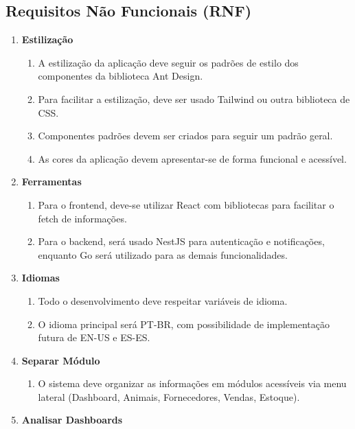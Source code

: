 \documentclass[12pt, a4paper]{article}
\begin{document}
\begin{spacing}{1.5}
\subsection{Requisitos Não Funcionais (RNF)}
\begin{spacing}{1.5}
\begin{enumerate}[label=RNF0\arabic{*}.]
    \item \textbf{Estilização}
    \begin{enumerate}[label=RNF01.0\arabic{*}]
        \item A estilização da aplicação deve seguir os padrões de estilo dos componentes da biblioteca Ant Design.
        \item Para facilitar a estilização, deve ser usado Tailwind ou outra biblioteca de CSS.
        \item Componentes padrões devem ser criados para seguir um padrão geral.
        \item As cores da aplicação devem apresentar-se de forma funcional e acessível.
    \end{enumerate}
    \item \textbf{Ferramentas}
    \begin{enumerate}[label=RNF02.0\arabic{*}]
        \item Para o frontend, deve-se utilizar React com bibliotecas para facilitar o fetch de informações.
        \item Para o backend, será usado NestJS para autenticação e notificações, enquanto Go será utilizado para as demais funcionalidades.
    \end{enumerate}
    \item \textbf{Idiomas}
    \begin{enumerate}[label=RNF03.0\arabic{*}]
        \item Todo o desenvolvimento deve respeitar variáveis de idioma.
        \item O idioma principal será PT-BR, com possibilidade de implementação futura de EN-US e ES-ES.
    \end{enumerate}
    \item \textbf{Separar Módulo}
    \begin{enumerate}[label=RNF04.0\arabic{*}]
        \item O sistema deve organizar as informações em módulos acessíveis via menu lateral (Dashboard, Animais, Fornecedores, Vendas, Estoque).
    \end{enumerate}
    \item \textbf{Analisar Dashboards}

\end{enumerate}
\end{spacing}
\end{spacing}
\end{document}
